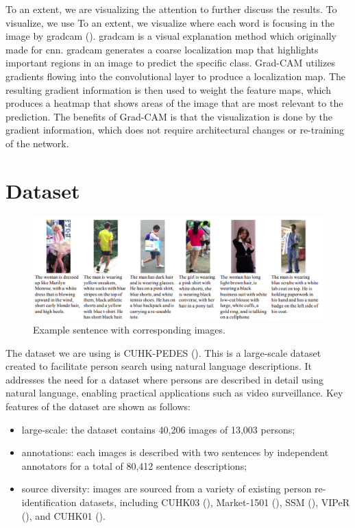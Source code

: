 To an extent, we are visualizing the attention to further discuss the results. To visualize, we use 
To an extent, we visualize where each word is focusing in the image by \acrfull{gradcam} (\cite{gradcam}).
\acrshort{gradcam} is a visual explanation method which originally made for \acrfull{cnn}. \acrshort{gradcam} generates a coarse localization map that highlights important regions in an image to predict the specific class. Grad-CAM utilizes gradients flowing into the convolutional layer to produce a localization map. The resulting gradient information is then used to weight the feature maps, which produces a heatmap that shows areas of the image that are most relevant to the prediction. The benefits of Grad-CAM is that the visualization is done by the gradient information, which does not require architectural changes or re-training of the network.


\section{Dataset}

\begin{figure}[htbp]
  \begin{center}
      \includegraphics[width=\linewidth]{img/cuhk_pedes.png}
      \caption{Example sentence with corresponding images.}
      \label{fig:cuhk_pedes}
  \end{center}
\end{figure}


The dataset we are using is CUHK-PEDES (\cite{li2017personsearchnaturallanguage}). This is a large-scale dataset created to facilitate person search using natural language descriptions. It addresses the need for a dataset where persons are described in detail using natural language, enabling practical applications such as video surveillance. Key features of the dataset are shown as follows:
\begin{itemize}
  \item large-scale: the dataset contains 40,206 images of 13,003 persons; 
  \item annotations: each images is described with two sentences by independent annotators for a total of 80,412 sentence descriptions;
  \item source diversity: images are sourced from a variety of existing person re-identification datasets, including CUHK03 (\cite{li2014deepreid}), Market-1501 (\cite{7410490}), SSM (\cite{ssm}), VIPeR (\cite{viper}), and CUHK01 (\cite{li2012human}).
\end{itemize}

